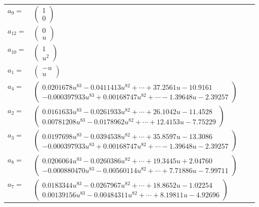 \documentclass[1p]{elsarticle_modified}
\theoremstyle{definition}
\begin{document}
\begin{tabular}{m{7pt} m{180pt} m{7pt} m{180pt} }
\flushright $a_{9}=$&$\begin{pmatrix}1\\0\end{pmatrix}$ \\
\flushright $a_{12}=$&$\begin{pmatrix}0\\u\end{pmatrix}$ \\
\flushright $a_{10}=$&$\begin{pmatrix}1\\u^2\end{pmatrix}$ \\
\flushright $a_{1}=$&$\begin{pmatrix}- u\\u\end{pmatrix}$ \\
\flushright $a_{4}=$&$\begin{pmatrix}0.0201678 u^{83}-0.0411413 u^{82}+\cdots+37.2561 u-10.9161\\-0.000397933 u^{83}+0.00168747 u^{82}+\cdots-1.39648 u-2.39257\end{pmatrix}$ \\
\flushright $a_{2}=$&$\begin{pmatrix}0.0161633 u^{83}-0.0261933 u^{82}+\cdots+26.1042 u-11.4528\\0.00781208 u^{83}-0.0178962 u^{82}+\cdots+12.4153 u-7.75229\end{pmatrix}$ \\
\flushright $a_{3}=$&$\begin{pmatrix}0.0197698 u^{83}-0.0394538 u^{82}+\cdots+35.8597 u-13.3086\\-0.000397933 u^{83}+0.00168747 u^{82}+\cdots-1.39648 u-2.39257\end{pmatrix}$ \\
\flushright $a_{8}=$&$\begin{pmatrix}0.0206064 u^{83}-0.0260386 u^{82}+\cdots+19.3445 u+2.04760\\-0.000880470 u^{83}-0.00560114 u^{82}+\cdots+7.71886 u-7.99711\end{pmatrix}$ \\
\flushright $a_{7}=$&$\begin{pmatrix}0.0183344 u^{83}-0.0267967 u^{82}+\cdots+18.8652 u-1.02254\\0.00139156 u^{83}-0.00484311 u^{82}+\cdots+8.19811 u-4.92696\end{pmatrix}$ \\

\end{tabular}
\end{document}
